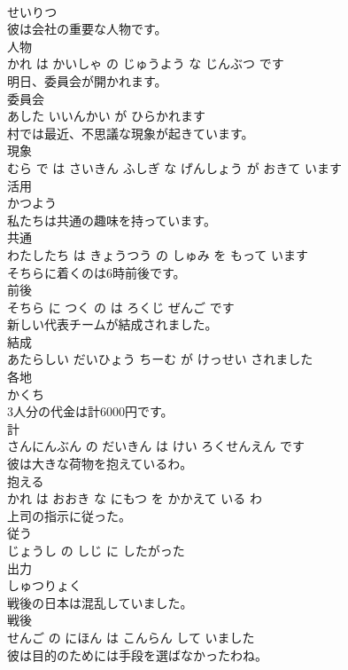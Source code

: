 \documentclass[8pt]{extreport}
\begin{document}
\begin{CJK}{UTF8}{min}
\\	せいりつ			
\\	彼は会社の重要な人物です。	
\\	人物 
\\	かれ は かいしゃ の じゅうよう な じんぶつ です			
\\	明日、委員会が開かれます。	
\\	委員会 
\\	あした いいんかい が ひらかれます			
\\	村では最近、不思議な現象が起きています。	
\\	現象 
\\	むら で は さいきん ふしぎ な げんしょう が おきて います			
\\	活用	
\\	かつよう			
\\	私たちは共通の趣味を持っています。	
\\	共通 
\\	わたしたち は きょうつう の しゅみ を もって います			
\\	そちらに着くのは6時前後です。	
\\	前後 
\\	そちら に つく の は ろくじ ぜんご です			
\\	新しい代表チームが結成されました。	
\\	結成 
\\	あたらしい だいひょう ちーむ が けっせい されました			
\\	各地	
\\	かくち			
\\	3人分の代金は計6000円です。	
\\	計 
\\	さんにんぶん の だいきん は けい ろくせんえん です			
\\	彼は大きな荷物を抱えているわ。	
\\	抱える 
\\	かれ は おおき な にもつ を かかえて いる わ			
\\	上司の指示に従った。	
\\	従う 
\\	じょうし の しじ に したがった			
\\	出力	
\\	しゅつりょく			
\\	戦後の日本は混乱していました。	
\\	戦後 
\\	せんご の にほん は こんらん して いました			
\\	彼は目的のためには手段を選ばなかったわね。	

\end{CJK}
\end{document}
